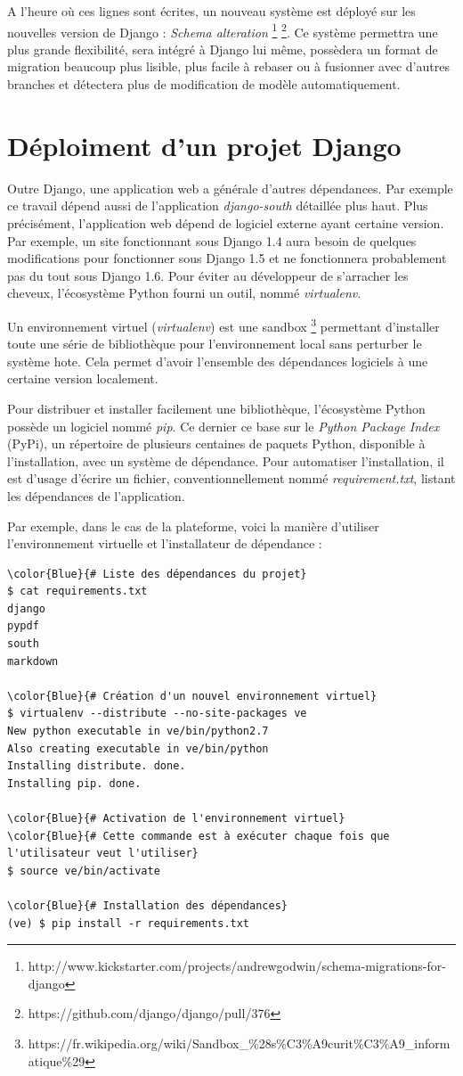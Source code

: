 \documentclass[a4paper,12pt]{article}
\begin{document}
A l'heure où ces lignes sont écrites, un nouveau système est déployé sur
les nouvelles version de Django : \textit{Schema alteration}
\footnote{http://www.kickstarter.com/projects/andrewgodwin/schema-migrations-for-django}
\footnote{https://github.com/django/django/pull/376}. Ce système permettra
une plus grande flexibilité, sera intégré à Django lui même, possèdera un
format de migration beaucoup plus lisible, plus facile à rebaser ou à
fusionner avec d'autres branches et détectera plus de modification de modèle
automatiquement.


\section{Déploiment d'un projet Django}

Outre Django, une application web a générale d'autres dépendances. Par exemple
ce travail dépend aussi de l'application \textit{django-south} détaillée plus haut.
Plus précisément, l'application web dépend de logiciel externe ayant certaine version.
Par exemple, un site fonctionnant sous Django 1.4 aura besoin de quelques modifications
pour fonctionner sous Django 1.5 et ne fonctionnera probablement pas du tout sous
Django 1.6. Pour éviter au développeur de s'arracher les cheveux, l'écosystème Python
fourni un outil, nommé \textit{virtualenv}.

Un environnement virtuel (\textit{virtualenv}) est une sandbox
\footnote{https://fr.wikipedia.org/wiki/Sandbox\_\%28s\%C3\%A9curit\%C3\%A9\_informatique\%29}
permettant d'installer toute une série de bibliothèque pour l'environnement
local sans perturber le système hote. Cela permet d'avoir l'ensemble des dépendances
logiciels à une certaine version localement.

Pour distribuer et installer facilement une bibliothèque, l'écosystème Python
possède un logiciel nommé \textit{pip}. Ce dernier ce base sur le
\textit{Python Package Index} (PyPi), un répertoire de plusieurs centaines de
paquets Python, disponible à l'installation, avec un système de dépendance.
Pour automatiser l'installation, il est d'usage d'écrire un fichier, conventionnellement
nommé \textit{requirement.txt}, listant les dépendances de l'application.

Par exemple, dans le cas de la plateforme, voici la manière d'utiliser l'environnement
virtuelle et l'installateur de dépendance :

\begin{Verbatim}
\color{Blue}{# Liste des dépendances du projet}
$ cat requirements.txt
django
pypdf
south
markdown

\color{Blue}{# Création d'un nouvel environnement virtuel}
$ virtualenv --distribute --no-site-packages ve
New python executable in ve/bin/python2.7
Also creating executable in ve/bin/python
Installing distribute. done.
Installing pip. done.

\color{Blue}{# Activation de l'environnement virtuel}
\color{Blue}{# Cette commande est à exécuter chaque fois que l'utilisateur veut l'utiliser}
$ source ve/bin/activate

\color{Blue}{# Installation des dépendances}
(ve) $ pip install -r requirements.txt
\end{Verbatim}
\end{document}
